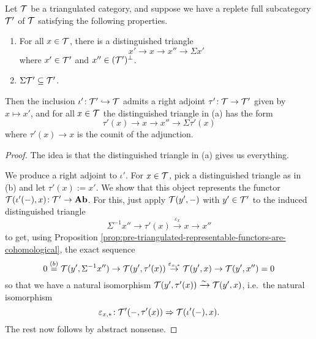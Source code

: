 \begin{proposition}\label{prop:adjoint-from-orthogonal-triangle}
	Let \(\mathcal{T}\) be a triangulated category, and suppose we have a replete full subcategory \(\mathcal{T}'\) of \(\mathcal{T}\) satisfying the following properties.
	\begin{enumerate}[label=(\alph*)]
	\item For all \(x\in\mathcal{T}\), there is a distinguished triangle
	\[ x'\to x\to x''\to \Sigma x' \]
	where \(x'\in\mathcal{T}'\) and \(x''\in(\mathcal{T}')^\perp\).
	\item \(\Sigma\mathcal{T}' \subseteq \mathcal{T}'\).
	\end{enumerate}
	Then the inclusion \(\iota'\!:\mathcal{T}'\hookrightarrow\mathcal{T}\) admits a right adjoint \(\tau'\!:\mathcal{T}\to\mathcal{T}'\) given by \(x\mapsto x'\), and for all \(x\in\mathcal{T}\) the distinguished triangle in (a) has the form
	\[ \tau'(x) \to x \to x'' \to \Sigma\tau'(x) \]
	where \(\tau'(x)\to x\) is the counit of the adjunction.
\end{proposition}
\begin{proof}
The idea is that the distinguished triangle in (a) gives us everything.

We produce a right adjoint to \(\iota'\). For \(x\in\mathcal{T}\), pick a distinguished triangle as in (b) and let \(\tau'(x) := x'\). We show that this object represents the functor \(\mathcal{T}(\iota'(-),x)\!:\mathcal{T}'\to\mathbf{Ab}\). For this, just
apply \(\mathcal{T}(y',-)\) with \(y'\in\mathcal{T}'\) to the induced distinguished triangle
\[ \Sigma^{-1}x''\to \tau'(x) \overset{\varepsilon_x}\to x\to x'' \]
to get, using Proposition \ref{prop:pre-triangulated-representable-functors-are-cohomological}, the exact sequence
\[ 0 \overset{(b)}= \mathcal{T}(y',\Sigma^{-1}x'')\to\mathcal{T}(y',\tau'(x))\overset{\varepsilon_{x,*}}\to\mathcal{T}(y',x)\to\mathcal{T}(y',x'') = 0 \]
so that we have a natural isomorphism \(\mathcal{T}(y',\tau'(x))\xrightarrow{\sim}\mathcal{T}(y',x)\), i.e.\ the natural isomorphism
\[\varepsilon_{x,*}\!:\mathcal{T}'(-,\tau'(x))\Rightarrow\mathcal{T}(\iota'(-),x).\]
The rest now follows by abstract nonsense.
\end{proof}

